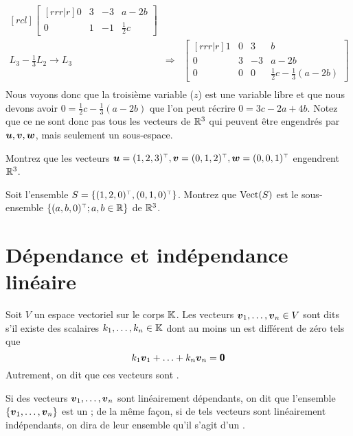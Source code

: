 \begin{exemple}
\[\begin{matrix}[rcl]
\begin{bmatrix}[rrr|r]
0 & 3 & -3 & a-2b \\
0 & 1 & -1 & \frac{1}{2}c
\end{bmatrix} \\[20pt]
L_3 - \frac{1}{3}L_2 \rightarrow L_3
&\Rightarrow&
\begin{bmatrix}[rrr|r]
1 & 0 & 3 & b\\
0 & 3 & -3 & a-2b \\
0 & 0 & 0 & \frac{1}{2}c -\frac{1}{3}(a-2b)
\end{bmatrix} \\[20pt]
\end{matrix}
\]
Nous voyons donc que la troisième variable ($z$) est une variable libre et que nous devons avoir
$0 =  \frac{1}{2}c -\frac{1}{3}(a-2b)$ que l'on peut récrire $0=3c-2a+4b$.  Notez que ce ne sont
donc pas tous les vecteurs de $\mathbb{R}^3$ qui peuvent être engendrés par $\boldsymbol{u}, \boldsymbol{v}, \boldsymbol{w}$,
mais seulement un sous-espace.
\end{exemple}
\begin{exerciceC}
Montrez que les vecteurs $\mat{u} = \transp{(1, 2, 3)}, \mat{v}=\transp{(0, 1, 2)}, \mat{w}=\transp{(0, 0, 1)}$
engendrent $\mathbb{R}^3$.
\end{exerciceC}
\begin{exerciceC}
Soit l'ensemble $S = \left\{\transp{(1, 2, 0)}, \transp{(0, 1, 0)}\right\}$.  Montrez que 
$\operatorname{Vect}(S)$ est le sous-ensemble $\left\{\transp{(a, b, 0)}; a, b \in \BBR\right\}$ de $\mathbb{R}^3$.
\end{exerciceC}

\newpage
\section{Dépendance et indépendance linéaire}

\begin{defini}
Soit $V$ un espace vectoriel sur le corps $\mathbb{K}$. 
Les vecteurs $\boldsymbol{v}_1, \ldots, \boldsymbol{v}_n \in V$ sont dits  s'il existe des scalaires
$k_1, \ldots, k_n \in \mathbb{K}$ dont au moins un est différent de zéro tels que
\[
k_1 \boldsymbol{v}_1 + \ldots + k_n \boldsymbol{v}_n = \mbox{\textsf{\textbf{{0}}}}
\]
Autrement, on dit que ces vecteurs sont .
\end{defini}
Si des vecteurs $\boldsymbol{v}_1, \ldots, \boldsymbol{v}_n$ sont linéairement dépendants, 
on dit que l'ensemble $\{\boldsymbol{v}_1, \ldots, \boldsymbol{v}_n\}$ est un ; 
de la même façon, si de tels vecteurs sont linéairement indépendants, on dira de leur
ensemble qu'il s'agit d'un .

